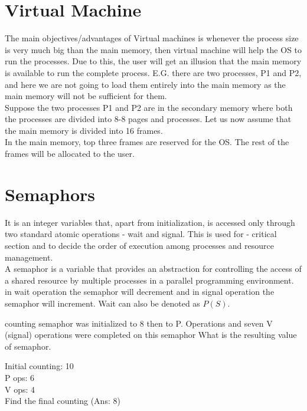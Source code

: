 \documentclass[12pt,letterpaper]{article}
\newenvironment{problem}[2][Problem]                                  
        {\begin{tcolorbox}[colback=white,colframe=gray!50,title=#1 #2]}
        {\end{tcolorbox}}
\begin{document}
  \section{Virtual Machine}
  The main objectives/advantages of Virtual machines is whenever the process size is very much big than the main memory, then virtual machine will help the OS to run the processes. Due to this, the user will get an illusion that the main memory is available to run the complete process. E.G. there are two processes, P1 and P2, and here we are not going to load them entirely into the main memory as the main memory will not be sufficient for them. \\
  Suppose the two processes P1 and P2 are in the secondary memory where both the processes are divided into 8-8 pages and processes. Let us now assume that the main memory is divided into 16 frames. \\
  In the main memory, top three frames are reserved for the OS. The rest of the frames will be allocated to the user. 
  \section{Semaphors}
  It is an integer variables that, apart from initialization, is accessed only through two standard atomic operations - wait and signal. This is used for - critical section and to decide the order of execution among processes and resource management. \\ 
  A semaphor is a variable that provides an abstraction for controlling the access of a shared resource by multiple processes in a parallel programming environment. 
  in wait operation the semaphor will decrement and in signal operation the semaphor will increment. Wait can also be denoted as $P(S)$. 
  \begin{problem}
    A counting semaphor was initialized to 8 then to P. Operations and seven V (signal) operations were completed on this semaphor
    What is the resulting value of semaphor. 
  \end{problem}
  \begin{problem}A
    Initial counting: 10 \\
    P ops: 6\\ 
    V ops: 4\\
    Find the final counting \hfill (Ans: 8)
  \end{problem}
\end{document}
